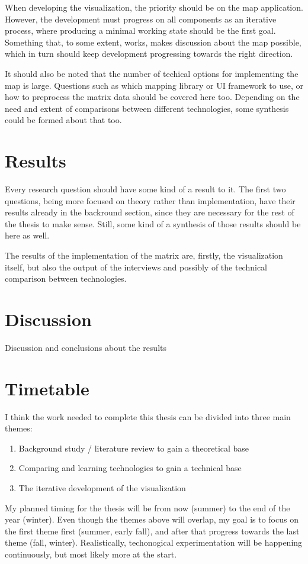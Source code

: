 \documentclass[12pt]{article}
\begin{document}
When developing the visualization, the priority should be on the map application.
However, the development must progress on all components as an iterative process,
where producing a minimal working state should be the first goal.
Something that, to some extent, works, makes discussion about the map possible,
which in turn should keep development progressing towards the right direction.

It should also be noted that the number of techical options for implementing the map is large.
Questions such as which mapping library or UI framework to use,
or how to preprocess the matrix data should be covered here too.
Depending on the need and extent of comparisons between different technologies,
some synthesis could be formed about that too.

\section{Results}

Every research question should have some kind of a result to it.
The first two questions, being more focused on theory rather than implementation,
have their results already in the backround section,
since they are necessary for the rest of the thesis to make sense.
Still, some kind of a synthesis of those results should be here as well.

The results of the implementation of the matrix are, firstly, the visualization itself,
but also the output of the interviews
and possibly of the technical comparison between technologies.

\section{Discussion}

Discussion and conclusions about the results

\section{Timetable}

I think the work needed to complete this thesis can be divided into three main themes:

\begin{enumerate}
	\item Background study / literature review to gain a theoretical base
	\item Comparing and learning technologies to gain a technical base
	\item The iterative development of the visualization
\end{enumerate}

My planned timing for the thesis will be from now (summer) to the end of the year (winter).
Even though the themes above will overlap,
my goal is to focus on the first theme first (summer, early fall),
and after that progress towards the last theme (fall, winter).
Realistically, techonogical experimentation will be happening continuously,
but most likely more at the start.

\printbibliography
\end{document}
